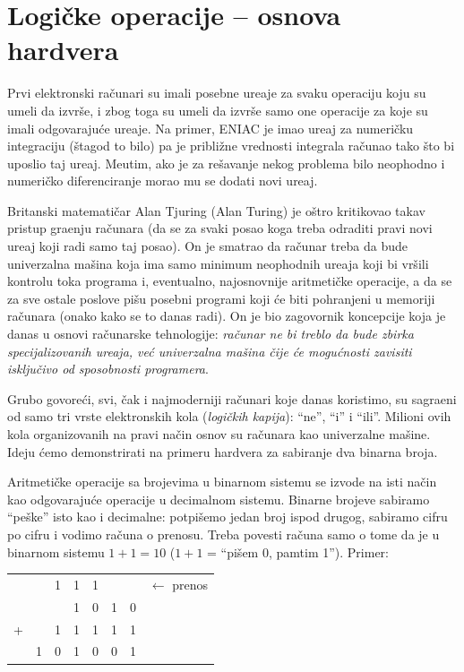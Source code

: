 \section{Logi\v cke operacije -- osnova hardvera}

Prvi elektronski ra\v cunari su imali posebne ure\dj aje za svaku operaciju
koju su umeli da izvr\v se, i zbog toga su umeli da izvr\v se samo one
operacije za koje su imali odgovaraju\'ce ure\dj aje. Na primer, ENIAC je
imao ure\dj aj za numeri\v cku integraciju (\v stagod to bilo) pa je
pribli\v zne vrednosti integrala ra\v cunao tako \v sto bi uposlio
taj ure\dj aj. Me\dj utim, ako je za re\v savanje nekog problema bilo neophodno
i numeri\v cko diferenciranje morao mu se dodati novi ure\dj aj.

Britanski matemati\v car Alan Tjuring (Alan Turing) je o\v stro
kritikovao takav pristup gra\dj enju ra\v cunara (da se za svaki posao
koga treba odraditi pravi novi ure\dj aj koji radi samo taj posao).
On je smatrao da ra\v cunar treba da bude univerzalna ma\v sina koja
ima samo minimum neophodnih ure\dj aja koji bi vr\v sili kontrolu toka
programa i, eventualno, najosnovnije aritmeti\v cke operacije, a da
se za sve ostale poslove pi\v su posebni programi koji \'ce biti pohranjeni
u memoriji ra\v cunara (onako kako se to danas radi).
On je bio zagovornik koncepcije koja je danas u osnovi ra\v cunarske
tehnologije: \emph{ra\v cunar ne bi treblo da bude zbirka specijalizovanih
ure\dj aja, ve\'c univerzalna ma\v sina \v cije \'ce mogu\'cnosti zavisiti
isklju\v civo od sposobnosti programera}.

Grubo govore\'ci, svi, \v cak i najmoderniji ra\v cunari koje danas
koristimo, su sa\-gra\-\dj e\-ni od samo tri vrste elektronskih kola
(\emph{logi\v ckih kapija}): \enquote{ne}, \enquote{i} i \enquote{ili}. Milioni ovih
kola organizovanih na pravi na\v cin osnov su ra\v cunara kao univerzalne
ma\v sine. Ideju \'cemo demonstrirati na primeru hardvera za sabiranje dva
binarna broja.

Aritmeti\v cke operacije sa brojevima u binarnom sistemu se izvode na
isti na\v cin kao odgovaraju\'ce operacije u decimalnom sistemu.
Binarne brojeve sabiramo \enquote{pe\v ske} isto kao i decimalne: potpi\v semo
jedan broj ispod drugog, sabiramo cifru po cifru i vodimo ra\v cuna o
prenosu. Treba povesti ra\v cuna samo o tome da je u binarnom sistemu
$1 + 1 = 10$ ($1 + 1$ = \enquote{pi\v sem 0, pamtim 1}). Primer:

\begin{center}
    \begin{tabular}{cc@{}c@{}c@{}c@{}c@{}cl}
        &  &\small 1&\small 1&\small 1&  &  &\small $\leftarrow$ prenos \\
        &  &        &       1&       0& 1& 0& \\
      + &  &       1&       1&       1& 1& 1& \\
      \hline
        & 1&       0&       1&       0& 0& 1&
    \end{tabular}
\end{center}

